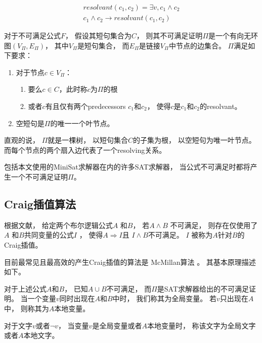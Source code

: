 \begin{equation}
\begin{array}{ccc}
&resolvant(c_1,c_2) = \exists v, c_1\wedge c_2 &\\
&c_1\wedge c_2 \to resolvant(c_1,c_2)&
\end{array}
\end{equation}

\begin{definition}
对于不可满足公式$F$，
假设其短句集合为$C$，
则其不可满足证明$\Pi$是一个有向无环图$(V_{\Pi},E_{\Pi})$，
其中$V_{\Pi}$是短句集合，
而$E_{\Pi}$是链接$V_{\Pi}$中节点的边集合。
$\Pi$满足如下要求：
\begin{enumerate}
\item 对于节点$c\in V_{\Pi}$：
  \begin{enumerate}
    \item 要么$c\in C$，此时称$c$为$\Pi$的根
    \item 或者$c$有且仅有两个predecessors $c_1$和$c_2$，
    使得$c$是$c_1$和$c_2$的resolvant。
  \end{enumerate}
\item 空短句是$\Pi$的唯一一个叶节点。
\end{enumerate}
\end{definition}

直观的说，
$\Pi$就是一棵树，
以短句集合$C$的子集为根，
以空短句为唯一叶节点。
而每个节点的两个扇入边代表了一个resolving关系。

包括本文使用的MiniSat求解器在内的许多SAT求解器，
当公式不可满足时都将产生一个不可满足证明$\Pi$。

\subsection{Craig插值算法}

根据文献，
给定两个布尔逻辑公式$A$ 和$B$，
若$A\wedge B$ 不可满足，
则存在仅使用了$A$ 和$B$共同变量的公式$I$ ，
使得$A\Rightarrow I$且
$I\wedge B$不可满足。
$I$ 被称为$A$针对$B$的Craig插值。

目前最常见且最高效的产生Craig插值的算法是
McMillan算法 。
其基本原理描述如下。

对于上述公式$A$和$B$，
已知$A\cup B$不可满足，
而$\Pi$是SAT求解器给出的不可满足证明。
当一个变量$v$同时出现在$A$和$B$中时，
我们称其为全局变量。
若$v$只出现在$A$中，
则称其为$A$本地变量。

对于文字$v$或者$\neg v$，
当变量$v$是全局变量或者$A$本地变量时，
称该文字为全局文字或者$A$本地文字。

